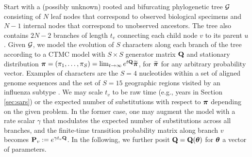 \documentclass[12pt]{article} %
\newcommand{\phylogeny}{{\cal G}}
\begin{document}
Start with a (possibly unknown) rooted and bifurcating phylogenetic tree $\phylogeny$ consisting of $N$ leaf nodes that correspond to observed biological specimens and $N-1$ internal nodes that correspond to unobserved ancestors.  The tree also contains $2N-2$ branches of length $t_v$ connecting each child node $v$ to its parent $u$.  
 Given $\phylogeny$, we model the evolution of $S$ characters along each branch of the tree according to a CTMC model with $S\times S$ generator matrix $\mathbf{Q}$ and stationary distribution $\boldsymbol{\pi}=(\pi_1,\dots,\pi_S)=\lim_{t\rightarrow \infty}e^{t\mathbf{Q}}\widetilde{\boldsymbol{\pi}}$, for $\widetilde{\boldsymbol{\pi}}$ for any arbitrary probability vector.   Examples of characters are the $S=4$ nucleotides within a set of aligned genome sequences  \citep{jukes1969evolution} and the set of $S=15$ geographic regions visited by an influenza subtype \citep{lemey2014unifying}.   We may scale $t_v$ to be raw time (e.g., years in Section \ref{sec:sars}) or the expected number of substitutions with respect to $\boldsymbol{\pi}$ depending on the given problem.   In the former case, one may augment the model with a rate scalar $\gamma$ that modulates the expected number of substitutions across all branches, and the finite-time transition probability matrix along branch $v$ becomes $\mathbf{P}_v:=e^{\gamma t_v \mathbf{Q}}$.  In the following, we further posit $\mathbf{Q}=\mathbf{Q}(\boldsymbol{\theta})$ for $\boldsymbol{\theta}$ a vector of parameters.
 
\end{document}
